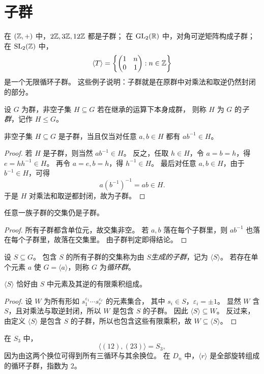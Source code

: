 \section{子群}
\begin{example}[先看具体子集]
在 $(\mathbb{Z},+)$ 中，$2\mathbb{Z},3\mathbb{Z},12\mathbb{Z}$ 都是子群；
在 $\mathrm{GL}_2(\mathbb{R})$ 中，对角可逆矩阵构成子群；
在 $\mathrm{SL}_2(\mathbb{Z})$ 中，
\[ \left\langle T\right\rangle= \left\{\begin{pmatrix} 1&n\\0&1 \end{pmatrix}:n\in \mathbb{Z}\right\} \]
是一个无限循环子群。
这些例子说明：子群就是在原群中对乘法和取逆仍然封闭的部分。
\end{example}
\begin{definition}
设 $G$ 为群，非空子集 $H\subseteq G$ 若在继承的运算下本身成群，
则称 $H$ 为 $G$ 的\emph{子群}，记作 $H\le G$。
\end{definition}
\begin{proposition}[子群判定]
非空子集 $H\subseteq G$ 是子群，当且仅当对任意 $a,b\in H$ 都有 $ab^{-1}\in H$。
\end{proposition}
\begin{proof}
若 $H$ 是子群，则当然 $ab^{-1}\in H$。
反之，任取 $h\in H$，令 $a=b=h$，得 $e=hh^{-1}\in H$。
再令 $a=e,b=h$，得 $h^{-1}\in H$。
最后对任意 $a,b\in H$，由于 $b^{-1}\in H$，可得
\[ a(b^{-1})^{-1}=ab\in H. \]
于是 $H$ 对乘法和取逆都封闭，故为子群。
\end{proof}
\begin{corollary}
任意一族子群的交集仍是子群。
\end{corollary}
\begin{proof}
所有子群都含单位元，故交集非空。
若 $a,b$ 落在每个子群里，则 $ab^{-1}$ 也落在每个子群里，故落在交集里。
由子群判定即得结论。
\end{proof}
\begin{definition}
设 $S\subseteq G$。
包含 $S$ 的所有子群的交集称为由 $S$\emph{生成的子群}，记为 $\langle S\rangle$。
若存在单个元素 $a$ 使 $G=\langle a\rangle$，则称 $G$ 为\emph{循环群}。
\end{definition}
\begin{proposition}
$\langle S\rangle$ 恰好由 $S$ 中元素及其逆的有限乘积组成。
\end{proposition}
\begin{proof}
设 $W$ 为所有形如 $s_1^{\varepsilon_1}\cdots s_r^{\varepsilon_r}$ 的元素集合，
其中 $s_i\in S$，$\varepsilon_i=\pm1$。
显然 $W$ 含 $S$，且对乘法与取逆封闭，所以 $W$ 是包含 $S$ 的子群。
因此 $\langle S\rangle\subseteq W$。
反过来，由定义 $\langle S\rangle$ 是包含 $S$ 的子群，所以也包含这些有限乘积，故 $W\subseteq \langle S\rangle$。
\end{proof}
\begin{example}
在 $S_3$ 中，
\[ \langle (12),(23)\rangle=S_3, \]
因为由这两个换位可得到所有三循环与其余换位。
在 $D_n$ 中，$\langle r\rangle$ 是全部旋转组成的循环子群，指数为 $2$。
\end{example}
